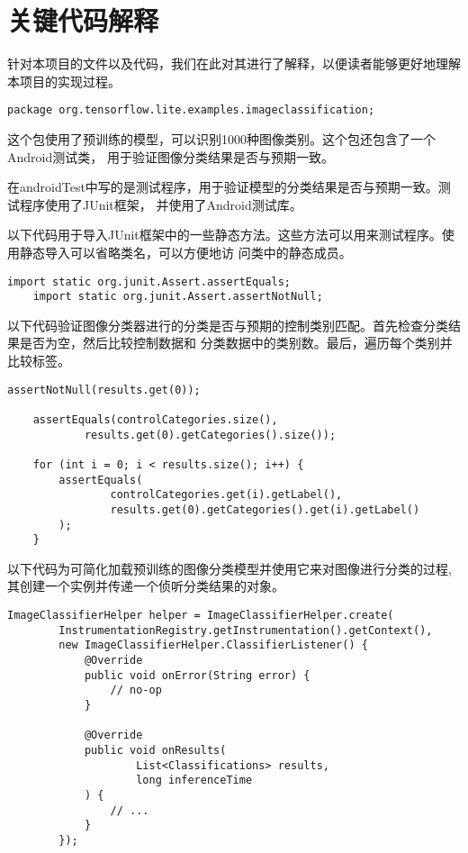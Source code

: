 \section{关键代码解释}
针对本项目的文件以及代码，我们在此对其进行了解释，以便读者能够更好地理解本项目的实现过程。
\begin{lstlisting}[style=code]
    package org.tensorflow.lite.examples.imageclassification;
\end{lstlisting}
这个包使用了预训练的模型，可以识别1000种图像类别。这个包还包含了一个Android测试类，
用于验证图像分类结果是否与预期一致。

在androidTest中写的是测试程序，用于验证模型的分类结果是否与预期一致。测试程序使用了JUnit框架，
并使用了Android测试库。

以下代码用于导入JUnit框架中的一些静态方法。这些方法可以用来测试程序。使用静态导入可以省略类名，可以方便地访
问类中的静态成员。
\begin{lstlisting}[style=code]
    import static org.junit.Assert.assertEquals;
    import static org.junit.Assert.assertNotNull;
\end{lstlisting}

\newpage
以下代码验证图像分类器进行的分类是否与预期的控制类别匹配。首先检查分类结果是否为空，然后比较控制数据和
分类数据中的类别数。最后，遍历每个类别并比较标签。
\begin{lstlisting}[style=code]
    assertNotNull(results.get(0));

    assertEquals(controlCategories.size(),
            results.get(0).getCategories().size());
    
    for (int i = 0; i < results.size(); i++) {
        assertEquals(
                controlCategories.get(i).getLabel(),
                results.get(0).getCategories().get(i).getLabel()
        );
    }
\end{lstlisting}

以下代码为可简化加载预训练的图像分类模型并使用它来对图像进行分类的过程,其创建一个实例并传递一个侦听分类结果的对象。
\begin{lstlisting}[style=code]
    ImageClassifierHelper helper = ImageClassifierHelper.create(
        InstrumentationRegistry.getInstrumentation().getContext(),
        new ImageClassifierHelper.ClassifierListener() {
            @Override
            public void onError(String error) {
                // no-op
            }

            @Override
            public void onResults(
                    List<Classifications> results,
                    long inferenceTime
            ) {
                // ...
            }
        });
\end{lstlisting}

